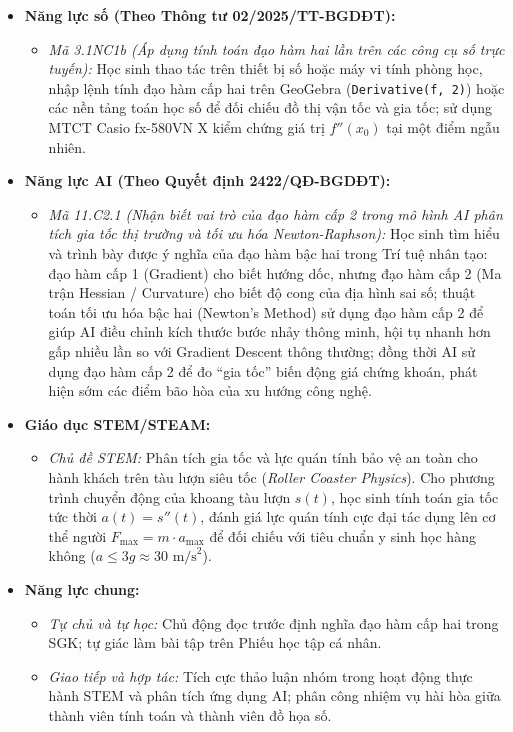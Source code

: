 \documentclass[12pt, a4paper]{article}
\begin{document}
\begin{itemize}[leftmargin=1.2cm]
    \item \textbf{Năng lực số (Theo Thông tư 02/2025/TT-BGDĐT):}
    \begin{itemize}[leftmargin=0.6cm]
        \item \textit{Mã 3.1NC1b (Áp dụng tính toán đạo hàm hai lần trên các công cụ số trực tuyến):} Học sinh thao tác trên thiết bị số hoặc máy vi tính phòng học, nhập lệnh tính đạo hàm cấp hai trên GeoGebra (\texttt{Derivative(f, 2)}) hoặc các nền tảng toán học số để đối chiếu đồ thị vận tốc và gia tốc; sử dụng MTCT Casio fx-580VN X kiểm chứng giá trị $f''(x_0)$ tại một điểm ngẫu nhiên.
    \end{itemize}

    \item \textbf{Năng lực AI (Theo Quyết định 2422/QĐ-BGDĐT):}
    \begin{itemize}[leftmargin=0.6cm]
        \item \textit{Mã 11.C2.1 (Nhận biết vai trò của đạo hàm cấp 2 trong mô hình AI phân tích gia tốc thị trường và tối ưu hóa Newton-Raphson):} Học sinh tìm hiểu và trình bày được ý nghĩa của đạo hàm bậc hai trong Trí tuệ nhân tạo: đạo hàm cấp 1 (Gradient) cho biết hướng dốc, nhưng đạo hàm cấp 2 (Ma trận Hessian / Curvature) cho biết độ cong của địa hình sai số; thuật toán tối ưu hóa bậc hai (Newton's Method) sử dụng đạo hàm cấp 2 để giúp AI điều chỉnh kích thước bước nhảy thông minh, hội tụ nhanh hơn gấp nhiều lần so với Gradient Descent thông thường; đồng thời AI sử dụng đạo hàm cấp 2 để đo ``gia tốc'' biến động giá chứng khoán, phát hiện sớm các điểm bão hòa của xu hướng công nghệ.
    \end{itemize}

    \item \textbf{Giáo dục STEM/STEAM:}
    \begin{itemize}[leftmargin=0.6cm]
        \item \textit{Chủ đề STEM:} Phân tích gia tốc và lực quán tính bảo vệ an toàn cho hành khách trên tàu lượn siêu tốc (\textit{Roller Coaster Physics}). Cho phương trình chuyển động của khoang tàu lượn $s(t)$, học sinh tính toán gia tốc tức thời $a(t) = s''(t)$, đánh giá lực quán tính cực đại tác dụng lên cơ thể người $F_{\text{max}} = m \cdot a_{\text{max}}$ để đối chiếu với tiêu chuẩn y sinh học hàng không ($a \leq 3g \approx 30\text{ m/s}^2$).
    \end{itemize}

    \item \textbf{Năng lực chung:}
    \begin{itemize}[leftmargin=0.6cm]
        \item \textit{Tự chủ và tự học:} Chủ động đọc trước định nghĩa đạo hàm cấp hai trong SGK; tự giác làm bài tập trên Phiếu học tập cá nhân.
        \item \textit{Giao tiếp và hợp tác:} Tích cực thảo luận nhóm trong hoạt động thực hành STEM và phân tích ứng dụng AI; phân công nhiệm vụ hài hòa giữa thành viên tính toán và thành viên đồ họa số.
    \end{itemize}
\end{itemize}
\end{document}
